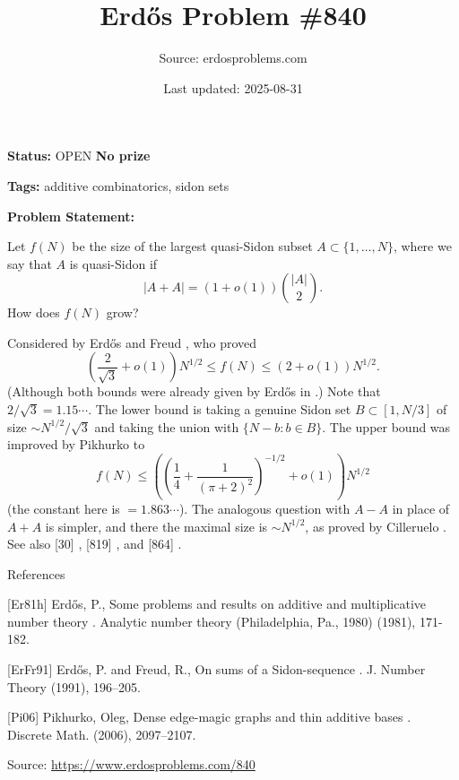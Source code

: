 \documentclass{article}
\title{Erd\H{o}s Problem \#840}
\date{Last updated: 2025-08-31}
\author{Source: erdosproblems.com}
\begin{document}
\maketitle

\noindent\textbf{Status:} OPEN \quad \textbf{No prize}

\noindent\textbf{Tags:} additive combinatorics, sidon sets

\medskip

\noindent\textbf{Problem Statement:}

Let $f(N)$ be the size of the largest quasi-Sidon subset $A\subset\{1,\ldots,N\}$, where we say that $A$ is quasi-Sidon if\[\lvert A+A\rvert=(1+o(1))\binom{\lvert A\rvert}{2}.\]How does $f(N)$ grow?




Considered by Erd\H{o}s and Freud \cite{ErFr91}, who proved\[\left(\frac{2}{\sqrt{3}}+o(1)\right)N^{1/2} \leq f(N) \leq \left(2+o(1)\right)N^{1/2}.\](Although both bounds were already given by Erd\H{o}s in \cite{Er81h}.) Note that $2/\sqrt{3}=1.15\cdots$. The lower bound is taking a genuine Sidon set $B\subset [1,N/3]$ of size $\sim N^{1/2}/\sqrt{3}$ and taking the union with $\{N-b : b\in B\}$. The upper bound was improved by Pikhurko \cite{Pi06} to\[f(N) \leq \left(\left(\frac{1}{4}+\frac{1}{(\pi+2)^2}\right)^{-1/2}+o(1)\right)N^{1/2}\](the constant here is $=1.863\cdots$). The analogous question with $A-A$ in place of $A+A$ is simpler, and there the maximal size is $\sim N^{1/2}$, as proved by Cilleruelo . See also [30] , [819] , and [864] .




References

[Er81h] Erd\H{o}s, P., Some problems and results on additive and multiplicative number theory . Analytic number theory (Philadelphia, Pa., 1980) (1981), 171-182.

[ErFr91] Erd\H{o}s, P. and Freud, R., On sums of a Sidon-sequence . J. Number Theory (1991), 196--205.

[Pi06] Pikhurko, Oleg, Dense edge-magic graphs and thin additive bases . Discrete Math. (2006), 2097--2107.


\bigskip
\noindent\small{Source: \url{https://www.erdosproblems.com/840}}
\end{document}
